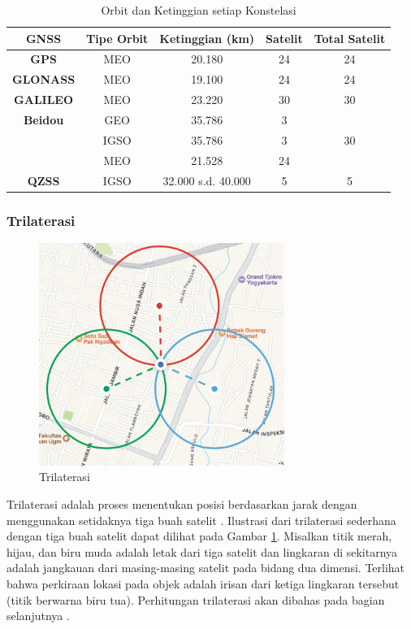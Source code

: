 \begin{table}[H]
	\caption{Orbit dan Ketinggian setiap Konstelasi \cite{Li2019} \cite{Bury2019}}
	\vspace{0.5em}
	\centering
	\begin{tabular}{ccccc}
		\hline
		\textbf{GNSS} &\textbf{Tipe Orbit} & \textbf{Ketinggian (km)} & \textbf{Satelit} & \textbf{Total Satelit}\\
		\hline 
		\textbf{GPS} & MEO & 20.180 & 24 & 24\\
		\textbf{GLONASS} & MEO & 19.100 & 24 & 24\\
		\textbf{GALILEO} & MEO & 23.220 & 30 & 30\\
		\textbf{Beidou} & GEO & 35.786 & 3\\
		& IGSO & 35.786 & 3 & 30\\
		& MEO& 21.528 & 24\\
		\textbf{QZSS} & IGSO &32.000 s.d. 40.000 & 5 & 5\\
		\hline
	\end{tabular}
	\label{Tab: gnss-orbit}
\end{table}

\subsubsection{Trilaterasi}
\begin{figure}[ht]
	\centering
	\includegraphics[width=8cm]{contents/chapter-2/trilaterasi.png}
	\caption{Trilaterasi}
	\label{Fig: Trilaterasi}
\end{figure}
Trilaterasi adalah proses menentukan posisi berdasarkan jarak dengan menggunakan setidaknya tiga buah satelit \cite{AmericanSocietyofCivilEngineers1994}. Ilustrasi dari trilaterasi sederhana dengan tiga buah satelit dapat dilihat pada Gambar \ref{Fig: Trilaterasi}. Misalkan titik merah, hijau, dan biru muda adalah letak dari tiga satelit dan lingkaran di sekitarnya adalah jangkauan dari masing-masing satelit pada bidang dua dimensi. Terlihat bahwa perkiraan lokasi pada objek adalah irisan dari ketiga lingkaran tersebut (titik berwarna biru tua). Perhitungan trilaterasi akan dibahas pada bagian selanjutnya \cite{Seo2012}.

